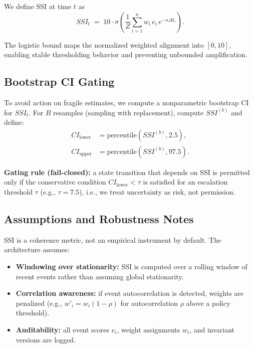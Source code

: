 \documentclass[conference]{IEEEtran}
\begin{document}
We define SSI at time $t$ as
\begin{equation}
\label{eq:ssi}
SSI_t \;=\; 10 \cdot \sigma\!\left(\frac{1}{Z}\sum_{i=1}^{n} w_i\, e_i\, e^{-\kappa \Delta t_i}\right).
\end{equation}

The logistic bound maps the normalized weighted alignment into $[0,10]$, enabling stable thresholding behavior and preventing unbounded amplification.

\subsection{Bootstrap CI Gating}
To avoid action on fragile estimates, we compute a nonparametric bootstrap CI for $SSI_t$.
For $B$ resamples (sampling with replacement), compute $SSI^{(b)}$ and define:
\begin{align}
CI_{\mathrm{lower}} &= \mathrm{percentile}(SSI^{(b)}, 2.5), \\
CI_{\mathrm{upper}} &= \mathrm{percentile}(SSI^{(b)}, 97.5).
\end{align}

\textbf{Gating rule (fail-closed):} a state transition that depends on SSI is permitted only if the conservative condition $CI_{\mathrm{lower}} < \tau$ is satisfied for an escalation threshold $\tau$ (e.g., $\tau=7.5$), i.e., we treat uncertainty as risk, not permission.

\subsection{Assumptions and Robustness Notes}
SSI is a coherence metric, not an empirical instrument by default.
The architecture assumes:
\begin{itemize}
\item \textbf{Windowing over stationarity:} SSI is computed over a rolling window of recent events rather than assuming global stationarity.
\item \textbf{Correlation awareness:} if event autocorrelation is detected, weights are penalized (e.g., $w'_i = w_i(1-\rho)$ for autocorrelation $\rho$ above a policy threshold).
\item \textbf{Auditability:} all event scores $e_i$, weight assignments $w_i$, and invariant versions are logged.
\end{itemize}

\end{document}
